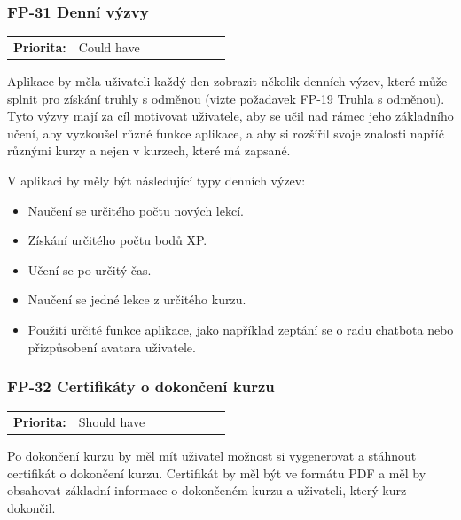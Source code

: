 
\subsubsection{FP-31 Denní výzvy}

\begin{tabular}{lp{0.7\linewidth}}
    \textbf{Priorita:} & Could have \\
\end{tabular}

Aplikace by měla uživateli každý den zobrazit několik denních výzev, které může splnit pro získání truhly s odměnou (vizte požadavek FP-19 Truhla s odměnou). %
Tyto výzvy mají za cíl motivovat uživatele, aby se učil nad rámec jeho základního učení, aby vyzkoušel různé funkce aplikace, a aby si rozšířil svoje znalosti napříč různými kurzy a nejen v kurzech, které má zapsané.

V aplikaci by měly být následující typy denních výzev:
\begin{itemize}
    \item Naučení se určitého počtu nových lekcí.
    \item Získání určitého počtu bodů XP.
    \item Učení se po určitý čas.
    \item Naučení se jedné lekce z určitého kurzu.
    \item Použití určité funkce aplikace, jako například zeptání se o radu chatbota nebo přizpůsobení avatara uživatele.
\end{itemize}

\subsubsection{FP-32 Certifikáty o dokončení kurzu}

\begin{tabular}{lp{0.7\linewidth}}
    \textbf{Priorita:} & Should have \\
\end{tabular}

Po dokončení kurzu by měl mít uživatel možnost si vygenerovat a stáhnout certifikát o dokončení kurzu. Certifikát by měl být ve formátu PDF a měl by obsahovat základní informace o dokončeném kurzu a uživateli, který kurz dokončil.

